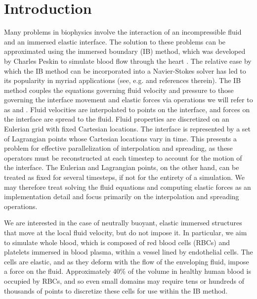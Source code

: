 \section{Introduction}

Many problems in biophysics involve the interaction of an incompressible fluid and an
immersed elastic interface. The solution to these problems can be approximated using the
immersed boundary (IB) method, which was developed by Charles Peskin to simulate blood
flow through the heart \cite{Peskin:1972wa}. The relative ease by which the IB method can
be incorporated into a Navier-Stokes solver has led to its popularity in myriad
applications (see, e.g. \cite{Iaccarino:2005ii,Griffith:2020hi} and references therein).
The IB method couples the equations governing fluid velocity and pressure to those
governing the interface movement and elastic forces via operations we will refer to as
 and . Fluid velocities are interpolated to points on
the interface, and forces on the interface are spread to the fluid. Fluid properties are
discretized on an Eulerian grid with fixed Cartesian locations. The interface is
represented by a set of Lagrangian points whose Cartesian locations vary in time. This
presents a problem for effective parallelization of interpolation and spreading, as these
operators must be reconstructed at each timestep to account for the motion of the
interface. The Eulerian and Lagrangian points, on the other hand, can be treated as fixed
for several timesteps, if not for the entirety of a simulation. We may therefore treat
solving the fluid equations and computing elastic forces as an implementation detail and
focus primarily on the interpolation and spreading operations.

We are interested in the case of neutrally buoyant, elastic immersed structures that move
at the local fluid velocity, but do not impose it. In particular, we aim to simulate
whole blood, which is composed of red blood cells (RBCs) and platelets immersed in blood
plasma, within a vessel lined by endothelial cells. The cells are elastic, and as they
deform with the flow of the enveloping fluid, impose a force on the fluid.  Approximately
40\% of the volume in healthy human blood is occupied by RBCs, and so even small domains
may require tens or hundreds of thousands of points to discretize these cells for use
within the IB method.

